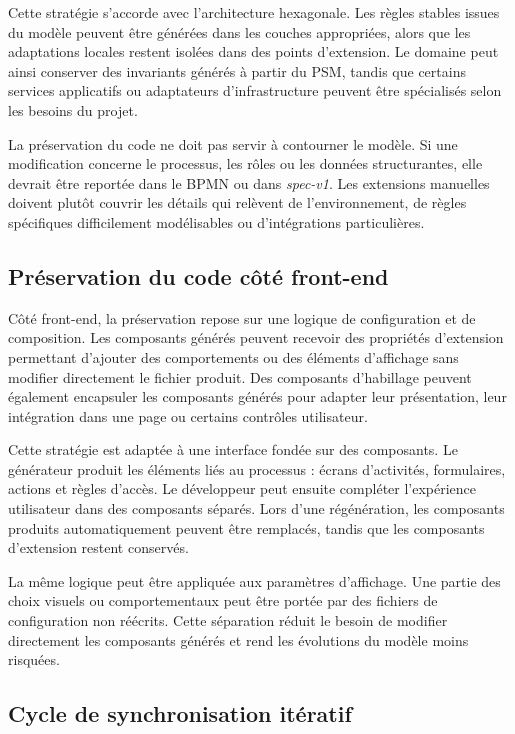 Cette stratégie s'accorde avec l'architecture hexagonale. Les règles stables issues du modèle peuvent être générées dans les couches appropriées, alors que les adaptations locales restent isolées dans des points d'extension. Le domaine peut ainsi conserver des invariants générés à partir du PSM, tandis que certains services applicatifs ou adaptateurs d'infrastructure peuvent être spécialisés selon les besoins du projet.

La préservation du code ne doit pas servir à contourner le modèle. Si une modification concerne le processus, les rôles ou les données structurantes, elle devrait être reportée dans le BPMN ou dans \textit{spec-v1}. Les extensions manuelles doivent plutôt couvrir les détails qui relèvent de l'environnement, de règles spécifiques difficilement modélisables ou d'intégrations particulières.

\subsection{Préservation du code côté front-end}

Côté front-end, la préservation repose sur une logique de configuration et de composition. Les composants générés peuvent recevoir des propriétés d'extension permettant d'ajouter des comportements ou des éléments d'affichage sans modifier directement le fichier produit. Des composants d'habillage peuvent également encapsuler les composants générés pour adapter leur présentation, leur intégration dans une page ou certains contrôles utilisateur.

Cette stratégie est adaptée à une interface fondée sur des composants. Le générateur produit les éléments liés au processus : écrans d'activités, formulaires, actions et règles d'accès. Le développeur peut ensuite compléter l'expérience utilisateur dans des composants séparés. Lors d'une régénération, les composants produits automatiquement peuvent être remplacés, tandis que les composants d'extension restent conservés.

La même logique peut être appliquée aux paramètres d'affichage. Une partie des choix visuels ou comportementaux peut être portée par des fichiers de configuration non réécrits. Cette séparation réduit le besoin de modifier directement les composants générés et rend les évolutions du modèle moins risquées.

\subsection{Cycle de synchronisation itératif}

